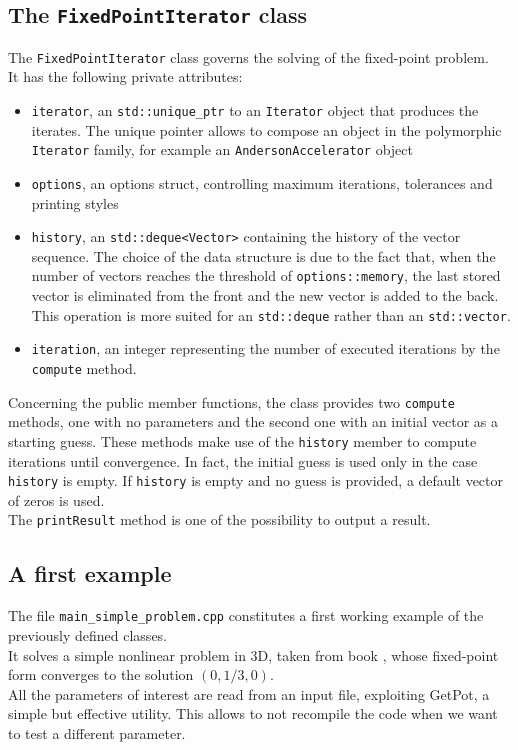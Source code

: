 \documentclass[12pt]{article}
\begin{document}
		
		\subsection {The \texttt{FixedPointIterator} class}
		The \texttt{FixedPointIterator} class governs the solving of the fixed-point problem.\\
		It has the following private attributes:
		\begin{itemize}
		\item \verb|iterator|, an \verb|std::unique_ptr| to an \verb|Iterator| object that produces the iterates. The unique pointer
		allows to compose an object in the polymorphic \verb|Iterator| family, for example an \verb|AndersonAccelerator| object
		\item \verb|options|, an options struct, controlling maximum iterations, tolerances and printing styles
		\item \verb|history|, an \verb|std::deque<Vector>| containing the history of the vector sequence. The choice of the
		data structure is due to the fact that, when the number of vectors reaches the threshold of \verb|options::memory|, the last stored
		vector is eliminated from the front and the new vector is added to the back. This operation is more suited for an
		\verb|std::deque| rather than an \verb|std::vector|.
		\item \verb|iteration|, an integer representing the number of executed iterations by the \verb|compute| method.
		\end{itemize}
		
		Concerning the public member functions, the class  provides two \verb|compute| methods, one with no parameters and the second one
		with an initial vector as a starting guess. These methods make use of the \verb|history| member to compute iterations until
		convergence. In fact, the initial guess is used only in the case \verb|history| is empty. If \verb|history| is empty
		and no guess is provided, a default vector of zeros is used.\\
		The \verb|printResult| method is one of the possibility to output a result.
		
		
		\subsection{A first example}
			The file \verb|main_simple_problem.cpp| constitutes a first working example of the previously defined classes.\\
			It solves a simple nonlinear problem in 3D, taken from book \cite{Quarteroni}, whose fixed-point form converges to
			the solution $(0,1/3,0)$.\\
			All the parameters of interest are read from an input file, exploiting GetPot, a simple but effective utility.
			This allows to not recompile the code when we want to test a different parameter.
			
\end{document}
